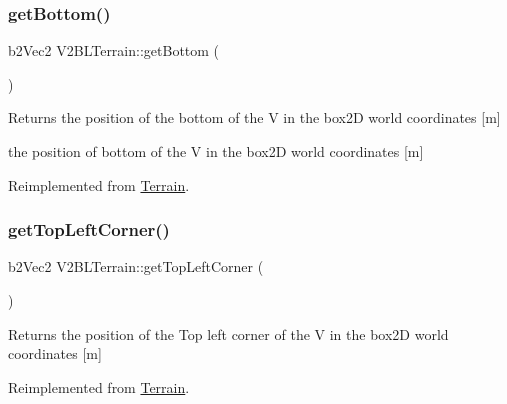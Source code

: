 \subsubsection{\texorpdfstring{get\+Bottom()}{getBottom()}}
{\footnotesize\ttfamily b2\+Vec2 V2\+B\+L\+Terrain\+::get\+Bottom (\begin{DoxyParamCaption}{ }\end{DoxyParamCaption})\hspace{0.3cm}{\ttfamily [virtual]}}

\begin{DoxyReturn}{Returns}
the position of the bottom of the V in the box2D world coordinates \mbox{[}m\mbox{]}

the position of bottom of the V in the box2D world coordinates \mbox{[}m\mbox{]} 
\end{DoxyReturn}


Reimplemented from \mbox{\hyperlink{class_terrain_a26e1c7c05b8256015730df34d97d29c2}{Terrain}}.

\mbox{\label{class_v2_b_l_terrain_a57bfd1489ee3074d08513865f2197897}} 
\subsubsection{\texorpdfstring{get\+Top\+Left\+Corner()}{getTopLeftCorner()}}
{\footnotesize\ttfamily b2\+Vec2 V2\+B\+L\+Terrain\+::get\+Top\+Left\+Corner (\begin{DoxyParamCaption}{ }\end{DoxyParamCaption})\hspace{0.3cm}{\ttfamily [virtual]}}

\begin{DoxyReturn}{Returns}
the position of the Top left corner of the V in the box2D world coordinates \mbox{[}m\mbox{]} 
\end{DoxyReturn}


Reimplemented from \mbox{\hyperlink{class_terrain_a8a8629396e5cb03961649acdc23eacf2}{Terrain}}.

\mbox{\label{class_v2_b_l_terrain_a2a3dc6ef761a5ab416669ce5f793558b}} 
